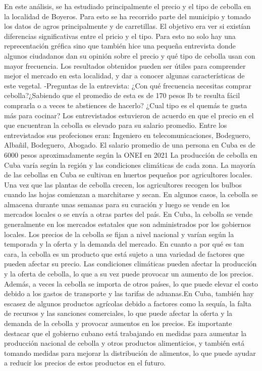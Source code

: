 \documentclass[]{article}
\begin{document}
En este análisis, se ha estudiado principalmente el precio y el tipo de cebolla en la localidad de Boyeros. Para esto se ha recorrido parte del municipio y tomado los datos de agros principalmente y de carretillas. El objetivo era ver si existían diferencias significativas entre el pricio y el tipo. Para esto no solo hay una reprecentación gréfica sino que también hice una pequeña entrevista donde algunos ciudadanos dan su opinión sobre el precio y qué tipo de cebolla usan con mayor frecuencia. Los resultados obtenidos pueden ser útiles para comprender mejor el mercado en esta localidad, y dar a conocer algunas características de este vegetal. 
-Preguntas de la entrevista: 
¿Con qué frecuencia necesitas comprar cebolla?¿Sabiendo que el promedio de esta es de 170 pesos lb te resulta fácil comprarla o a veces te abstiences de hacerlo? ¿Cual tipo es el quemás te gusta más para cocinar?
Los entrevistados estuvieron de acuerdo en que el precio en el que encuentran la cebolla es elevado para su salario promedio. Entre los entrevistados sus profeciones eran: Ingeniero en telecomunicaciones, Bodeguero, Albañil, Bodeguero, Abogado. El salario promedio de una persona en Cuba es de 6000 pesos aproximadamente según la ONEI  en 2021  La producción de cebolla en Cuba varía según la región y las condiciones climáticas de cada zona. La mayoría de las cebollas en Cuba se cultivan en huertos pequeños por agricultores locales. Una vez que las plantas de cebolla crecen, los agricultores recogen los bulbos cuando las hojas comienzan a marchitarse y secan. En algunos casos, la cebolla se almacena durante unas semanas para su curación y luego se vende en los mercados locales o se envía a otras partes del país. En Cuba, la cebolla se vende generalmente en los mercados estatales que son administrados por los gobiernos locales. Los precios de la cebolla se fijan a nivel nacional y varían según la temporada y la oferta y la demanda del mercado. En cuanto a por qué es tan cara, la cebolla es un producto que está sujeto a una variedad de factores que pueden afectar su precio. Las condiciones climáticas pueden afectar la producción y la oferta de cebolla, lo que a su vez puede provocar un aumento de los precios. Además, a veces la cebolla se importa de otros países, lo que puede elevar el costo debido a los gastos de transporte y las tarifas de aduanas.En Cuba, también hay escasez de algunos productos agrícolas debido a factores como la sequía, la falta de recursos y las sanciones comerciales, lo que puede afectar la oferta y la demanda de la cebolla y provocar aumentos en los precios. Es importante destacar que el gobierno cubano está trabajando en medidas para aumentar la producción nacional de cebolla y otros productos alimenticios, y también está tomando medidas para mejorar la distribución de alimentos, lo que puede ayudar a reducir los precios de estos productos en el futuro.
\end{document}
